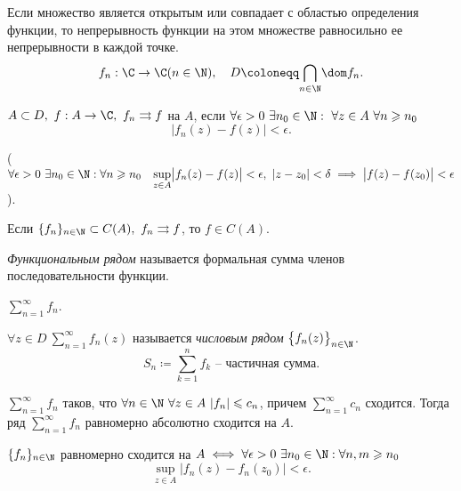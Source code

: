 \begin{remark}
	Если множество является открытым или совпадает с областью определения функции, то непрерывность функции на этом множестве равносильно ее непрерывности в каждой точке.
	\[
		f_n: \C \rightarrow \C (n \in \N), \quad D \coloneqq \underset{n \in \N}{\bigcap} \dom f_n.
	\]
\end{remark}

\begin{definition}
	$ A \subset D, \ f : A \rightarrow \C, \ f_n \rightrightarrows f $ на $ A $, если $ \forall \epsilon > 0 \ \exists n_0 \in \N : \ \forall z \in A \ \forall n \geqslant n_0 $
	\[
		\big|f_n(z) - f(z)\big| < \epsilon.
	\]

	\Big($ \forall \epsilon > 0 \ \exists n_0 \in \N:  \forall n \geqslant n_0 \quad \underset{z \in A}{\sup} \big| f_n(z) - f(z) \big| < \epsilon, \ | z - z_0 | < \delta \implies \big| f(z) - f(z_0) \big| < \epsilon $\Big).
\end{definition}

\begin{theorem}[Вейерштрасса]
	Если $ \{f_n\}_{n\in\N} \subset C(A), \ f_n \rightrightarrows f $, то $ f \in C(A) $.
\end{theorem}

\begin{definition}
	\emph{Функциональным рядом} называется формальная сумма членов последовательности функции.
	\begin{notation}
		$\sum_{n=1}^{\infty}f_n$.
	\end{notation}
\end{definition}

\begin{definition}
	$ \forall z \in D \ \sum_{n=1}^{\infty}f_n(z) $ называется \emph{числовым рядом} $ \big\{f_n(z)\big\}_{n \in \N} $.
	\[
		S_n \coloneqq \sum_{k=1}^{n}f_k \text{ -- частичная сумма}.
	\]
\end{definition}

\begin{theorem}
	$ \sum_{n=1}^{\infty}f_n $ таков, что $ \forall n \in \N \ \forall z \in A \ | f_n | \leqslant c_n $, причем $ \sum_{n=1}^{\infty} c_n $ сходится. Тогда ряд $ \sum_{n=1}^{\infty} f_n $ равномерно абсолютно сходится на $ A $.
\end{theorem}

\begin{theorem}
	$ \{f_n\}_{n\in\N} $ равномерно сходится на $ A \iff \forall \epsilon > 0 \ \exists n_0 \in \N: \forall n,m \geqslant n_0 $
	\[
		\underset{z \in A}{\sup}\big|f_n(z) - f_n(z_0)\big| < \epsilon.
	\]
\end{theorem}

